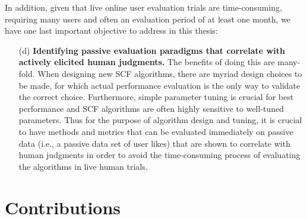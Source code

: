 In addition, given that live online user evaluation trials are
time-consuming, requiring many users and often an evaluation period of
at least one month, we have one last important objective to address in
this thesis:
\begin{enumerate}
\item[(d)] {\bf Identifying passive evaluation paradigms that correlate
with actively elicited human judgments.}  The benefits of doing this
are many-fold.  When designing new SCF algorithms, there are myriad
design choices to be made, for which actual performance evaluation is
the only way to validate the correct choice.  Furthermore, simple
parameter tuning is crucial for best performance and SCF algorithms
are often highly sensitive to well-tuned parameters.  Thus for the
purpose of algorithm design and tuning, it is crucial to have methods
and metrics that can be evaluated immediately on passive data (i.e., a
passive data set of user likes) that are shown to correlate with human
judgments in order to avoid the time-consuming process of evaluating
the algorithms in live human trials.
\end{enumerate}


\section{Contributions}

\label{sec:Contributions}

